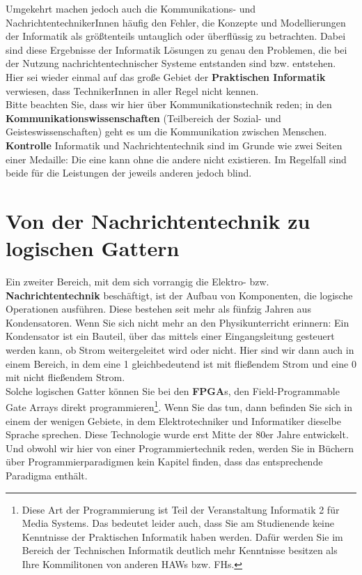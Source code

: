 Umgekehrt machen jedoch auch die Kommunikations- und NachrichtentechnikerInnen häufig den Fehler, die Konzepte und Modellierungen der Informatik als größtenteils untauglich oder überflüssig zu betrachten. Dabei sind diese Ergebnisse der Informatik Lösungen zu genau den Problemen, die bei der Nutzung nachrichtentechnischer Systeme entstanden sind bzw. entstehen. Hier sei wieder einmal auf das große Gebiet der \textbf{Praktischen Informatik} verwiesen, dass TechnikerInnen in aller Regel nicht kennen.\\

Bitte beachten Sie, dass wir hier über Kommunikationstechnik reden; in den \textbf{Kommunikationswissenschaften} (Teilbereich der Sozial- und Geisteswissenschaften) geht es um die Kommunikation zwischen Menschen.\\

\textbf{Kontrolle}
Informatik und Nachrichtentechnik sind im Grunde wie zwei Seiten einer Medaille: Die eine kann ohne die andere nicht existieren. Im Regelfall sind beide für die Leistungen der jeweils anderen jedoch blind.

\section{Von der Nachrichtentechnik zu logischen Gattern}

Ein zweiter Bereich, mit dem sich vorrangig die Elektro- bzw. \textbf{Nachrichtentechnik} beschäftigt, ist der Aufbau von Komponenten, die logische Operationen ausführen. Diese bestehen seit mehr als fünfzig Jahren aus Kondensatoren. Wenn Sie sich nicht mehr an den Physikunterricht erinnern: Ein Kondensator ist ein Bauteil, über das mittels einer Eingangsleitung gesteuert werden kann, ob Strom weitergeleitet wird oder nicht. Hier sind wir dann auch in einem Bereich, in dem eine 1 gleichbedeutend ist mit fließendem Strom und eine 0 mit nicht fließendem Strom. \\

Solche logischen Gatter können Sie bei den \textbf{FPGA}s, den Field-Programmable Gate Arrays direkt programmieren\footnote{Diese Art der Programmierung ist Teil der Veranstaltung Informatik 2 für Media Systems. Das bedeutet leider auch, dass Sie am Studienende keine Kenntnisse der Praktischen Informatik haben werden. Dafür werden Sie im Bereich der Technischen Informatik deutlich mehr Kenntnisse besitzen als Ihre Kommilitonen von anderen HAWs bzw. FHs.}. Wenn Sie das tun, dann befinden Sie sich in einem der wenigen Gebiete, in dem Elektrotechniker und Informatiker dieselbe Sprache sprechen. Diese Technologie wurde erst Mitte der 80er Jahre entwickelt. Und obwohl wir hier von einer Programmiertechnik reden, werden Sie in Büchern über Programmierparadigmen kein Kapitel finden, dass das entsprechende Paradigma enthält.\\

